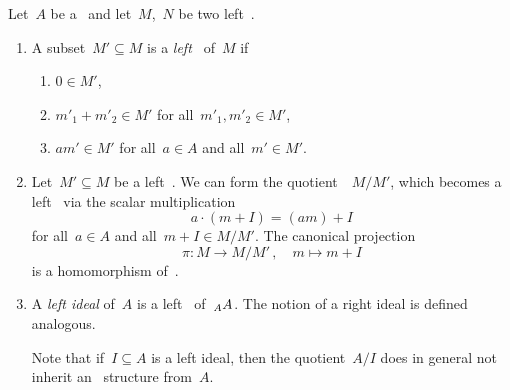 \begin{remarkdefinition}
  Let~$A$ be a~{\kalg} and let~$M$,~$N$ be two left~{}.
  \begin{enumerate}
    \item
      A subset~$M' \subseteq M$ is a \emph{left~{}} of~$M$ if
      \begin{enumerate}[label=(S\arabic*)]
        \item
          $0 \in M'$,
        \item
          $m'_1 + m'_2 \in M'$ for all~$m'_1, m'_2 \in M'$,
        \item
          $a m' \in M'$ for all~$a \in A$ and all~$m' \in M'$.
      \end{enumerate}
    \item
      Let~$M' \subseteq M$ be a left~{}.
      We can form the quotient~{\module{$\kf$}}~$M/M'$, which becomes a left~{} via the scalar multiplication
      \[
          a \cdot (m + I)
        = (am) + I
      \]
      for all~$a \in A$ and all~$m + I \in M/M'$.
      The canonical projection
      \[
                \pi
        \colon  M
        \to     M/M' \,,
        \quad   m
        \mapsto m + I
      \]
      is a homomorphism of~{}.
    \item
      A \emph{left ideal} of~$A$ is a left~{} of~$\indmodule[A]{A}$.
      The notion of a right ideal is defined analogous.
      
      Note that if~$I \subseteq A$ is a left ideal, then the quotient~$A/I$ does in general not inherit an~{\kalg} structure from~$A$.


\end{enumerate}
\end{remarkdefinition}
